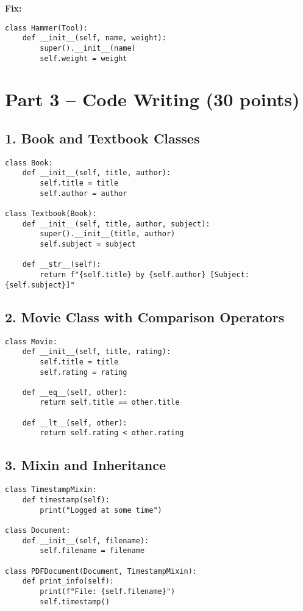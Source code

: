 \documentclass[12pt]{article}
\begin{document}
\textbf{Fix:}
\begin{verbatim}
class Hammer(Tool):
    def __init__(self, name, weight):
        super().__init__(name)
        self.weight = weight
\end{verbatim}

\newpage

\section*{Part 3 – Code Writing (30 points)}

\subsection*{1. Book and Textbook Classes}

\begin{verbatim}
class Book:
    def __init__(self, title, author):
        self.title = title
        self.author = author

class Textbook(Book):
    def __init__(self, title, author, subject):
        super().__init__(title, author)
        self.subject = subject

    def __str__(self):
        return f"{self.title} by {self.author} [Subject: {self.subject}]"
\end{verbatim}

\subsection*{2. Movie Class with Comparison Operators}

\begin{verbatim}
class Movie:
    def __init__(self, title, rating):
        self.title = title
        self.rating = rating

    def __eq__(self, other):
        return self.title == other.title

    def __lt__(self, other):
        return self.rating < other.rating
\end{verbatim}

\subsection*{3. Mixin and Inheritance}

\begin{verbatim}
class TimestampMixin:
    def timestamp(self):
        print("Logged at some time")

class Document:
    def __init__(self, filename):
        self.filename = filename

class PDFDocument(Document, TimestampMixin):
    def print_info(self):
        print(f"File: {self.filename}")
        self.timestamp()
\end{verbatim}
\end{document}
